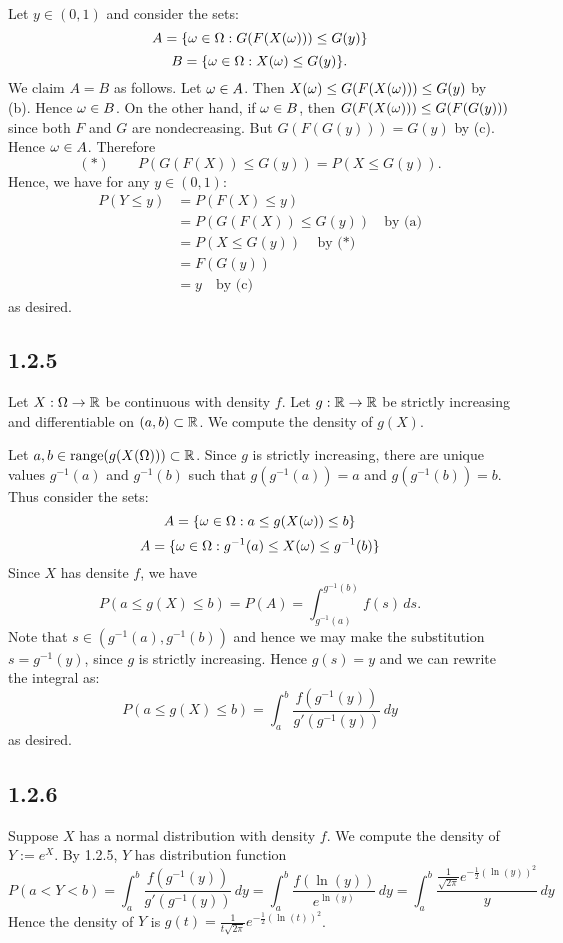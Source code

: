 \documentclass[11pt]{article}
\begin{document}
    Let $y \in (0,1)$ and consider the sets: \[A = \{\omega \in \Omega : G(F(X(\omega))) \leq G(y)\}\]\[B = \{\omega \in \Omega : X(\omega) \leq G(y)\}.\] We claim $A = B$ as follows. Let $\omega \in A$. Then $X(\omega) \leq G(F(X(\omega))) \leq G(y)$ by (b). Hence $\omega \in B$. On the other hand, if $\omega \in B$, then $G(F(X(\omega))) \leq G(F(G(y)))$ since both $F$ and $G$ are nondecreasing. But $G(F(G(y))) = G(y)$ by (c). Hence $\omega \in A$. Therefore \[(*) \quad\quad P(G(F(X)) \leq G(y)) = P(X \leq G(y)). \] Hence, we have for any $y \in (0,1)$:\begin{align*}
    P(Y \leq y) &= P(F(X) \leq y)\\
    &= P(G(F(X)) \leq G(y)) \quad \text{by (a)} \\
    &= P(X \leq G(y))\quad \text{by ($*$)}\\
    &= F(G(y)) \\
    &= y \quad \text{by (c)}
\end{align*} as desired.

\subsection*{1.2.5}

Let $X:\Omega \to {\mathbb R}$ be continuous with density $f$. Let $g:{\mathbb R} \to {\mathbb R}$ be strictly increasing and differentiable on $(a,b) \subset {\mathbb R}$. We compute the density of $g(X)$.

Let $a, b \in \text{range}(g(X(\Omega))) \subset {\mathbb R}$. Since $g$ is strictly increasing, there are unique values $g^{-1}(a)$ and $g^{-1}(b)$ such that $g(g^{-1}(a)) = a$ and $g(g^{-1}(b))=b$. Thus consider the sets: \[A = \{\omega \in \Omega : a \leq g(X(\omega))\leq  b\}\]\[A = \{\omega \in \Omega : g^{-1}(a) \leq X(\omega)\leq  g^{-1}(b)\}\] Since $X$ has densite $f$, we have \[P(a\leq g(X) \leq b)=P(A) = \int_{g^{-1}(a)}^{g^{-1}(b)} f(s)  \,ds.\] Note that $s \in ({g^{-1}(a)},{g^{-1}(b)})$ and hence we may make the substitution $s = g^{-1}(y)$, since $g$ is strictly increasing. Hence $g(s) = y$ and we can rewrite the integral as: \[P(a\leq g(X) \leq b) =\int_{a}^{b} \frac{f(g^{-1}(y))}{g'(g^{-1}(y))}  \,dy\] as desired.

\subsection*{1.2.6}

Suppose $X$ has a normal distribution with density $f$. We compute the density of $Y := e^X$. By 1.2.5, $Y$ has distribution function \[P(a<Y<b)=\int_a^b \frac{f(g^{-1}(y))}{g'(g^{-1}(y))} \,dy = \int_a^b \frac{f(\ln(y))}{e^{\ln(y)}} \, dy = \int_a^b \frac{\frac{1}{\sqrt{2\pi}} e^{-\frac12 (\ln(y))^2}}{y} \, dy\] Hence the density of $Y$ is $g(t) = \frac{1}{t\sqrt{2\pi}} e^{-\frac12 (\ln(t))^2}$.
\end{document}
